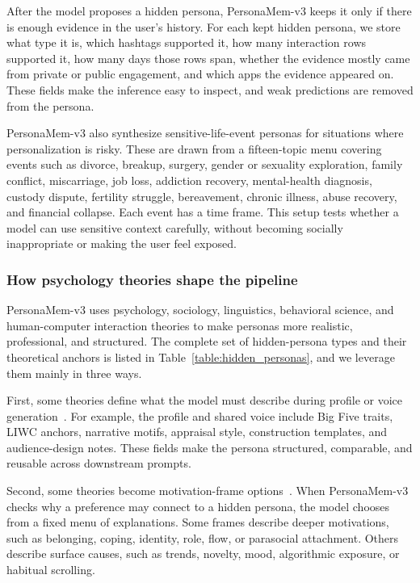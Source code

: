 \documentclass[]{fairmeta}
\begin{document}
After the model proposes a hidden persona, PersonaMem-v3 keeps it only if there is enough evidence in the user’s history. For each kept hidden persona, we store what type it is, which hashtags supported it, how many interaction rows supported it, how many days those rows span, whether the evidence mostly came from private or public engagement, and which apps the evidence appeared on. These fields make the inference easy to inspect, and weak predictions are removed from the persona.

PersonaMem-v3 also synthesize sensitive-life-event personas for situations where personalization is risky. These are drawn from a fifteen-topic menu covering events such as divorce, breakup, surgery, gender or sexuality exploration, family conflict, miscarriage, job loss, addiction recovery, mental-health diagnosis, custody dispute, fertility struggle, bereavement, chronic illness, abuse recovery, and financial collapse. Each event has a time frame. This setup tests whether a model can use sensitive context carefully, without becoming socially inappropriate or making the user feel exposed.

\subsubsection{How psychology theories shape the pipeline}
\label{subsec:psych_plumbing}

PersonaMem-v3 uses psychology, sociology, linguistics, behavioral science, and human-computer interaction theories to make personas more realistic, professional, and structured. The complete set of hidden-persona types and their theoretical anchors is listed in Table~\ref{table:hidden_personas}, and we leverage them mainly in three ways.

First, some theories define what the model must describe during profile or voice generation~\citep{mccrae1992introduction,pennebaker2015development,mcadams1985power,martin2005language,goldberg1995constructions,bakhtin1986speech,bell1984language}. For example, the profile and shared voice include Big Five traits, LIWC anchors, narrative motifs, appraisal style, construction templates, and audience-design notes. These fields make the persona structured, comparable, and reusable across downstream prompts.

Second, some theories become motivation-frame options~\citep{deci1985intrinsic,katz1973uses,goffman1959presentation,kardefelt2014conceptual,higgins1987self,horton1956mass,lazarus1984stress,csikszentmihalyi1990flow,berlyne1960conflict,barthes1981camera,tajfel1979integrative,stryker1980symbolic,rosenstock1974historical,tversky1974judgment,bikhchandani1992theory,schwarz1990feelings,skinner1953science}. When PersonaMem-v3 checks why a preference may connect to a hidden persona, the model chooses from a fixed menu of explanations. Some frames describe deeper motivations, such as belonging, coping, identity, role, flow, or parasocial attachment. Others describe surface causes, such as trends, novelty, mood, algorithmic exposure, or habitual scrolling. 
\end{document}
